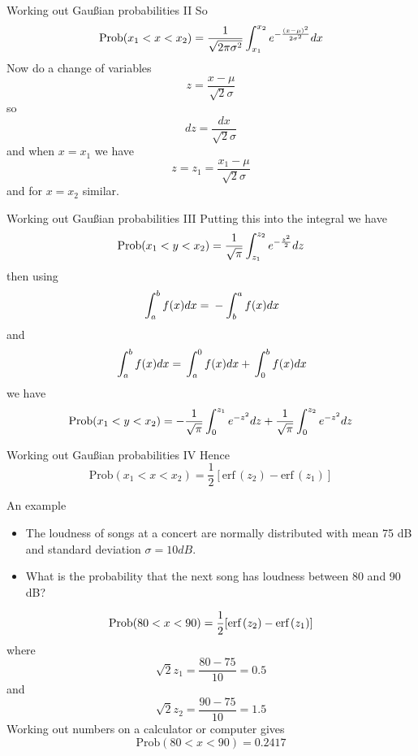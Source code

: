 \documentclass{beamer}
\begin{document}
\begin{frame}{Working out Gau\ss{}ian probabilities II}
So
\color{reddish}
$$
\mbox{Prob}(x_1<x<x_2)=\frac{1}{\sqrt{2\pi\sigma^2}}
\color{blueish}\int^{x_2}_{x_1}\color{reddish} 
e^{-\frac{(\color{blueish}{}x\color{reddish}-\mu)^2}{2\sigma^2}}\color{blueish}{}dx\color{reddish}
$$
\color{black}
Now do a change of variables
\color{blueish}{}
$$
z=\frac{x-\mu}{\sqrt{2}\sigma}
$$
\color{black}
so 
\color{blueish}{}
$$
dz=\frac{dx}{\sqrt{2}\sigma}
$$
\color{black}
and when \color{blueish}{}$x=x_1$\color{black}{} we have
\color{blueish}{}
$$
z=z_1=\frac{x_1-\mu}{\sqrt{2}\sigma}
$$
\color{black}
and for \color{blueish}{}$x=x_2$\color{black}{} similar.


\end{frame}

\begin{frame}{Working out Gau\ss{}ian probabilities III}
Putting this into the integral we have
\color{reddish}
$$
\mbox{Prob}(x_1<y<x_2)=\frac{1}{\sqrt{\pi}}\color{greenish}{}\int_{z_1}^{z_2}\color{reddish}{} e^{-\frac{z^2}{2}}dz
$$
\color{black}{}
then using
\color{reddish}
$$
\color{greenish}{}\int_a^b\color{reddish}f(x)dx=\color{greenish}{}-\int_b^a\color{reddish} f(x)dx
$$
\color{black}{}
and
\color{reddish}
$$
\color{greenish}{}\int_a^b\color{reddish}f(x)dx=\color{greenish}{}\int_a^0\color{reddish} f(x)dx+\color{greenish}{}\int_0^b\color{reddish} f(x)dx
$$
\color{black}{}
we have
\color{reddish}
$$
\mbox{Prob}(x_1<y<x_2)=-\frac{1}{\sqrt{\pi}}\color{greenish}{}\int_{0}^{z_1}\color{reddish}{} e^{-z^2}dz+\frac{1}{\sqrt{\pi}}\color{greenish}{}\int_{0}^{z_2}\color{reddish} e^{-z^2}dz
$$
\color{black}
\end{frame}

\begin{frame}{Working out Gau\ss{}ian probabilities IV}
Hence
\color{purple}
$$
\mbox{Prob}(x_1<x<x_2)=\frac{1}{2}[\mbox{erf}\,(z_2)-\mbox{erf}\,(z_1)]
$$
\color{black}{}
\end{frame}

\begin{frame}{An example}
\begin{itemize}
\item The loudness of songs at a concert are normally distributed with mean 75 dB and standard deviation\color{reddish}{} $\sigma=10 dB$\color{black}{}. 
\item What is the probability that the next song has loudness between 80 and 90 dB?
\end{itemize}
\color{reddish}
$$
\mbox{Prob}(80<x<90)=\frac{1}{2}[\mbox{erf}\,(\color{blueish}{}z_2\color{reddish})-\mbox{erf}\,(\color{blueish}{}z_1\color{reddish})]
$$
\color{black}
where 
\color{blueish}{}
$$
\sqrt{2}z_1=\frac{80-75}{10}=0.5
$$
\color{black}{}
and 
\color{blueish}{}
$$
\sqrt{2}z_2=\frac{90-75}{10}=1.5
$$
\color{black}{}
Working out numbers on a calculator or computer gives
\color{reddish}
$$
\mbox{Prob}(80<x<90)=0.2417
$$
\color{black}{}
\end{frame}
\end{document}
